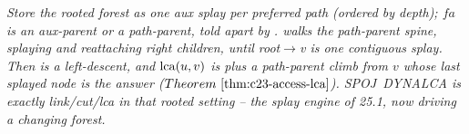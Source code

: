 \begin{recallbox}
\emph{Store the rooted forest as one aux splay per preferred path (ordered by
depth); \(\mathit{fa}\) is an aux-parent or a path-parent, told apart by
.  walks the path-parent spine, splaying and
reattaching right children, until root\(\to\)v is one contiguous splay. Then
 is a left-descent, and \(\operatorname{lca}(u,v)\) is  plus a
path-parent climb from \(v\) whose last splayed node is the answer
(\(\thmref{c23-access-lca}\)). SPOJ~DYNALCA is exactly link/cut/lca in that rooted
setting -- the splay engine of 25.1, now driving a changing forest.}
\end{recallbox}
